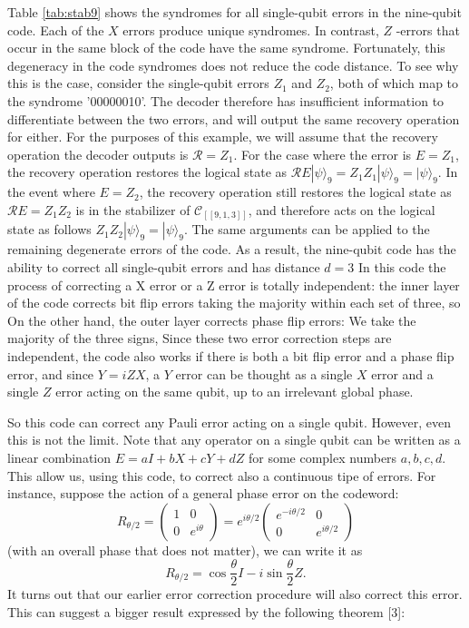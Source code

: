 Table \ref{tab:stab9} shows the syndromes for all single-qubit errors in the nine-qubit code. Each of the $X$ errors produce unique syndromes. In contrast, $Z$ -errors that occur in the same block of the code have the same syndrome. Fortunately, this degeneracy in the code syndromes does not reduce the code distance. To see why this is the case, consider the single-qubit errors $Z_{1}$ and $Z_{2}$, both of which map to the syndrome '00000010'. The decoder therefore has insufficient information to differentiate between the two errors, and will output the same recovery operation for either. For the purposes of this example, we will assume that the recovery operation the decoder outputs is $\mathcal{R}=Z_{1}$. For the case where the error is $E=Z_{1}$, the recovery operation restores the logical state as $\mathcal{R} E|\psi\rangle_{9}=Z_{1} Z_{1}|\psi\rangle_{9}=|\psi\rangle_{9} .$ In the event where $E=Z_{2}$, the recovery operation still restores the logical state as $\mathcal{R} E=Z_{1} Z_{2}$ is in the stabilizer of $\mathcal{C}_{[[9,1,3]]}$, and therefore acts on the logical state as follows $Z_{1} Z_{2}|\psi\rangle_{9}=|\psi\rangle_{9} .$ The same arguments can be applied to the remaining degenerate errors of the code. As a result, the nine-qubit code has the ability to correct all single-qubit errors and has distance $d=3$
In this code the process of correcting a X error or a Z error is totally independent: 
the inner layer of the code corrects bit flip errors taking the majority within each set of three, so 
On the other hand, the outer layer corrects phase flip errors: We take the majority of the three signs,
Since these two error correction steps are independent, the code also works if there is both a bit flip error and a phase flip error, and since $Y = iZX$, a $Y$ error can be thought as a single $X$ error and a single $Z$ error acting on the same qubit, up to an irrelevant global phase.

So this code can correct any Pauli error acting on a single qubit. However, even this is not the limit. Note that any operator on a single qubit can be written as a linear combination $E= aI + bX + cY+dZ$ for some complex numbers $a,b,c,d$. This allow us, using this code, to correct also a continuous tipe of errors. For instance, suppose the action of a general phase error on the codeword: 
$$
R_{\theta / 2}=\left(\begin{array}{cc}
1 & 0 \\
0 & e^{i \theta}
\end{array}\right)=e^{i \theta / 2}\left(\begin{array}{cc}
e^{-i \theta / 2} & 0 \\
0 & e^{i \theta / 2}
\end{array}\right)
$$
(with an overall phase that does not matter), we can write it as
$$
R_{\theta / 2}=\cos \frac{\theta}{2} I-i \sin \frac{\theta}{2} Z .
$$
It turns out that our earlier error correction procedure will also correct this error.
This can suggest a bigger result expressed by the following theorem [3]:

